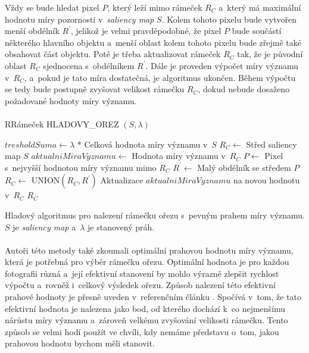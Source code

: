Vždy se bude hledat pixel $P$, který leží mimo rámeček $R_C$ a~který má maximální hodnotu míry pozornosti v~\emph{saliency map} $S$. Kolem tohoto pixelu bude vytvořen menší obdélník $R^{\prime}$, jelikož je velmi pravděpodobné, že pixel $P$ bude součástí některého hlavního objektu a~menší oblast kolem tohoto pixelu bude zřejmě také obsahovat část objektu. Poté je třeba aktualizovat rámeček $R_C$ tak, že je původní oblast $R_C$ sjednocena s~obdélníkem $R^{\prime}$. Dále je proveden výpočet míry významu v~$R_C$, a~pokud je tato míra dostatečná, je algoritmus ukončen. Během výpočtu se tedy bude postupně zvyšovat velikost rámečku $R_C$, dokud nebude dosaženo požadované hodnoty míry významu.

\paragraph{}
\begin{algorithm}[H]
 RRámeček HLADOVY\_OREZ $(S, \lambda)$
 
 $tresholdSuma \leftarrow \lambda$ * Celková hodnota míry významu v~$S$\;
 $R_C \leftarrow$ Střed saliency map $S$\;
 $aktualniMiraVyznamu \leftarrow$ Hodnota míry významu v~$R_C$\;
  {
  $P \leftarrow$ Pixel s~nejvyšší hodnotou míry významu mimo $R_C$\;
  $R^{\prime} \leftarrow$ Malý obdélník se středem $P$\;
  $R_C \leftarrow$ UNION$(R_C, R^{\prime})$\;
  Aktualizace $aktualniMiraVyznamu$ na novou hodnotu v~$R_C$\;
 }
 \Return $R_C$\;
 
 \caption{Hladový algoritmus\cite{Suh2003} pro nalezení rámečku ořezu s~pevným prahem míry významu. $S$ je \emph{saliency map} a~$\lambda$ je stanovený práh.}
 \label{algoritmus:greedy}
\end{algorithm}

\paragraph{}
Autoři této metody také zkoumali optimální prahovou hodnotu míry významu, která je potřebná pro výběr rámečku ořezu. Optimální hodnota je pro každou fotografii různá a~její efektivní stanovení by mohlo výrazně zlepšit rychlost výpočtu a~rovněž i~celkový výsledek ořezu. Způsob nalezení této efektivní prahové hodnoty je přesně uveden v~referenčním článku \cite{Suh2003}. Spočívá v~tom, že tato efektivní hodnota je nalezena jako bod, od kterého dochází k~co nejmenšímu nárůstu míry významu a~zároveň velkému zvyšování velikosti rámečku. Tento způsob se velmi hodí použít ve chvíli, kdy nemáme představu o~tom, jakou prahovou hodnotu bychom měli stanovit.

